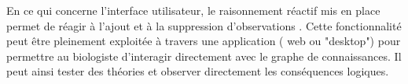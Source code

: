 \begin{refsegment}
En ce qui concerne l'interface utilisateur, le raisonnement réactif mis en place permet de réagir à l'ajout et à la suppression  d'observations . Cette fonctionnalité peut être pleinement exploitée à travers une application ( web ou "desktop") pour permettre au biologiste d'interagir directement avec le graphe de connaissances. Il peut ainsi tester des théories et observer directement les conséquences logiques.

\subbibliography
\end{refsegment}
